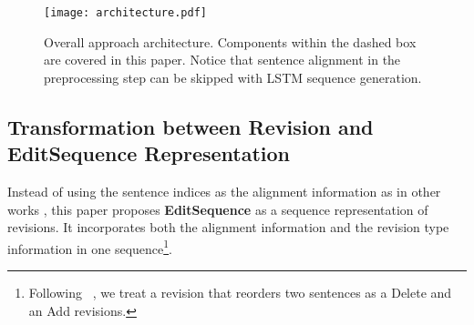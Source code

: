 \documentclass[11pt]{article}
\begin{document}
\begin{figure*}
\centering
\texttt{[image: architecture.pdf]}
\caption{Overall approach architecture. Components within the dashed box are covered in this paper. Notice that sentence alignment in the preprocessing step can be skipped with LSTM sequence generation.}
\label{figure:architecture}
\end{figure*}

\subsection{Transformation between Revision and EditSequence Representation}
Instead of using the sentence indices as the alignment information as in other works \cite{blunsom2006discriminative}, this paper proposes \textbf{EditSequence} as a sequence representation of revisions. It incorporates both the alignment information and the revision type information in one sequence\footnote{Following ~\cite{zhang-litman:2016:N16-1}, we treat a revision that reorders two sentences as a Delete and an Add revisions.}. 
\end{document}
